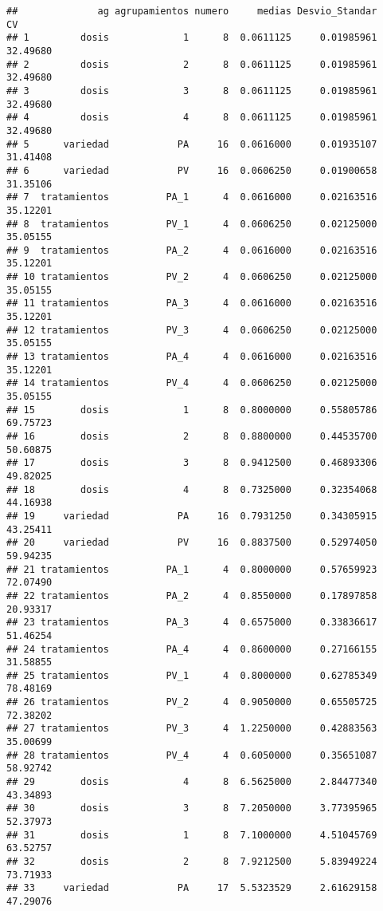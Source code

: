 \documentclass[
]{article}
\begin{document}
\begin{verbatim}
##              ag agrupamientos numero     medias Desvio_Standar       CV
## 1         dosis             1      8  0.0611125     0.01985961 32.49680
## 2         dosis             2      8  0.0611125     0.01985961 32.49680
## 3         dosis             3      8  0.0611125     0.01985961 32.49680
## 4         dosis             4      8  0.0611125     0.01985961 32.49680
## 5      variedad            PA     16  0.0616000     0.01935107 31.41408
## 6      variedad            PV     16  0.0606250     0.01900658 31.35106
## 7  tratamientos          PA_1      4  0.0616000     0.02163516 35.12201
## 8  tratamientos          PV_1      4  0.0606250     0.02125000 35.05155
## 9  tratamientos          PA_2      4  0.0616000     0.02163516 35.12201
## 10 tratamientos          PV_2      4  0.0606250     0.02125000 35.05155
## 11 tratamientos          PA_3      4  0.0616000     0.02163516 35.12201
## 12 tratamientos          PV_3      4  0.0606250     0.02125000 35.05155
## 13 tratamientos          PA_4      4  0.0616000     0.02163516 35.12201
## 14 tratamientos          PV_4      4  0.0606250     0.02125000 35.05155
## 15        dosis             1      8  0.8000000     0.55805786 69.75723
## 16        dosis             2      8  0.8800000     0.44535700 50.60875
## 17        dosis             3      8  0.9412500     0.46893306 49.82025
## 18        dosis             4      8  0.7325000     0.32354068 44.16938
## 19     variedad            PA     16  0.7931250     0.34305915 43.25411
## 20     variedad            PV     16  0.8837500     0.52974050 59.94235
## 21 tratamientos          PA_1      4  0.8000000     0.57659923 72.07490
## 22 tratamientos          PA_2      4  0.8550000     0.17897858 20.93317
## 23 tratamientos          PA_3      4  0.6575000     0.33836617 51.46254
## 24 tratamientos          PA_4      4  0.8600000     0.27166155 31.58855
## 25 tratamientos          PV_1      4  0.8000000     0.62785349 78.48169
## 26 tratamientos          PV_2      4  0.9050000     0.65505725 72.38202
## 27 tratamientos          PV_3      4  1.2250000     0.42883563 35.00699
## 28 tratamientos          PV_4      4  0.6050000     0.35651087 58.92742
## 29        dosis             4      8  6.5625000     2.84477340 43.34893
## 30        dosis             3      8  7.2050000     3.77395965 52.37973
## 31        dosis             1      8  7.1000000     4.51045769 63.52757
## 32        dosis             2      8  7.9212500     5.83949224 73.71933
## 33     variedad            PA     17  5.5323529     2.61629158 47.29076

\end{verbatim}
\end{document}
